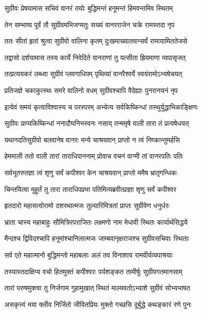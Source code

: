 \twolineshloka
{सुग्रीवः प्रेषयामास सचिवं वानरं तयोः}
{बुद्धिमन्तं हनूमन्तं हिमवन्तमिव स्थितम्}


\twolineshloka
{तेन सम्भाष्य पूर्वं तौ सुग्रीवमभिजग्मतुः}
{सख्यं वानरराजेन चक्रे रामस्तदा नृप}


\twolineshloka
{ततः सीतां हृतां श्रुत्वा सुग्रीवो वालिना कृतम्}
{दुःखमाख्यातवान्सर्वं रामायामिततेजसे}


\twolineshloka
{तद्वासो दर्शयामास तस्य कार्ये निवेदिते}
{वानराणां तु यत्सीता ह्रियमाणा व्यपासृजत्}


\twolineshloka
{तत्प्रत्ययकरं लब्ध्वा सुग्रीवं प्लवगाधिपम्}
{पृथिव्यां वानरैश्वर्ये स्वयंरामोऽभ्यषेचयत्}


\twolineshloka
{प्रतिजज्ञे चकाकुत्स्थः समरे वालिनो वधम्}
{सुग्रीवश्चापि वैदेह्याः पुनरानयनं नृप}


\twolineshloka
{इत्येवं समयं कृत्वाविश्वास्य च परस्परम्}
{अभ्येत्य सर्वकिष्किन्धां तस्थुर्युद्धाभिकाङ्क्षिणः}


\twolineshloka
{सुग्रीवः प्राप्यकिष्किन्धां ननादौघनिभस्वनः}
{नसाय् तन्ममृषे वाली तारा तं प्रत्यषेधयत्}


\twolineshloka
{यथानदतिसुग्रीवो बलवानेष वानरः}
{मन्ये चाश्रयवान् प्राप्तो न त्वं निष्क्रान्तुमर्हसि}


\twolineshloka
{हेममाली ततो वाली तारां ताराधिपाननाम्}
{प्रोवाच वचनं वाग्मी तां वानरपतिः पतिः}


\twolineshloka
{सर्वभूतरुतज्ञा त्वं शृणु सर्वं कपीश्वर}
{केन चाश्रयवान् प्राप्तो ममैष भ्रातृगन्धिकः}

\twolineshloka
{चिन्तयित्वा मुहूर्तं तु तारा ताराधिपप्रभा}
{पतिमित्यब्रवीत्प्राज्ञा शृणु सर्वं कपीश्वर}


\twolineshloka
{हृतदारो महासत्वोरामो दशरथात्मजः}
{तुल्यारिमित्रतां प्राप्तः सुग्रीवेण धनुर्धरः}


\twolineshloka
{भ्राता चास्य महाबाहुः सौमित्रिरपराजितः}
{लक्ष्मणो नाम मेधावी स्थितः कार्यार्थसिद्धये}


\twolineshloka
{मैन्दश्च द्विविदश्चापि हनूमांश्चानिलात्मजः}
{जाम्बवानृक्षराजश्च सुग्रीवसचिवाः स्थिताः}


\twolineshloka
{सर्व एते महात्मानो बुद्धिमन्तो महाबलाः}
{अलं तव विनाशाय रामवीर्यव्यपाश्रयाः}


\twolineshloka
{तस्यास्तदाक्षिप्य वचो हितमुक्तं कपीश्वरः}
{पर्यशङ्कत तामीर्षुः सुग्रीवगतमानसाम्}


\twolineshloka
{तारां परुषमुक्त्वा तु निर्जगाम गुहामुखात्}
{स्थितं माल्यवतोऽभ्याशे सुग्रीवं सोभ्यभाषत}


\twolineshloka
{असकृत्त्वं मया क्लीव निर्जितो जीवितप्रियः}
{मुक्तो गच्छसि दुर्बुद्धे कथङ्कारं रणे पुनः}


